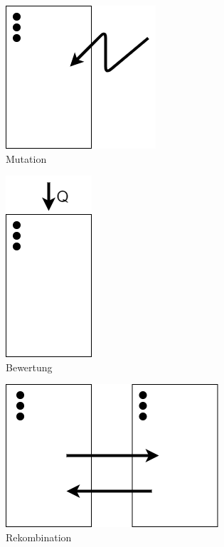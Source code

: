 \begin{figure}[!htb]
	\centering
	\includegraphics[scale=0.5]{img/rechenberg_notation/mutation.png}
	\caption{Mutation}
\label{fig:mutation}
\end{figure}
\begin{figure}[!htb]
	\centering
	\includegraphics[scale=0.5]{img/rechenberg_notation/bewertung.png}
	\caption{Bewertung}
\label{fig:bewertung}
\end{figure}
\begin{figure}[!htb]
	\centering
	\includegraphics[scale=0.5]{img/rechenberg_notation/rekombination.png}
	\caption{Rekombination}
\label{fig:rekombination}
\end{figure}
